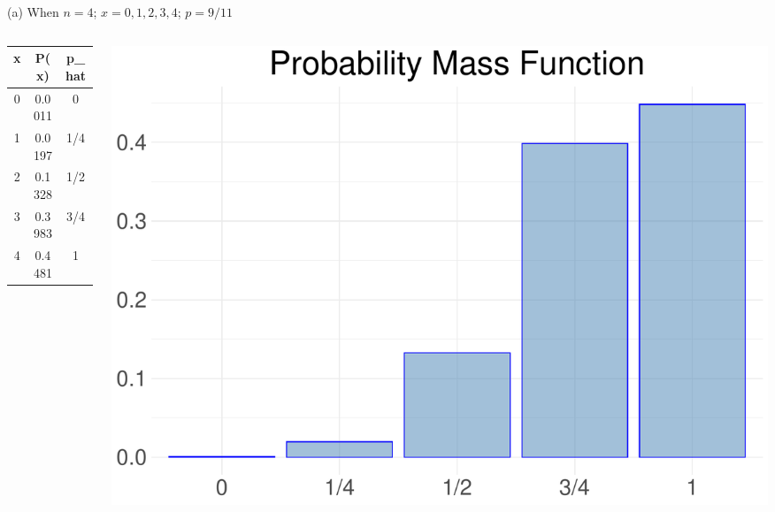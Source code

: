 \documentclass[
  11pt,
  ignorenonframetext,
]{beamer}
\begin{document}
\begin{frame}{(a) When \(n = 4\); \(x = 0,1,2,3,4\); \(p=9/11\)}
\protect\hypertarget{a-when-n-4-x-01234-p911}{}
\begin{columns}[T]
\begin{column}{0.48\textwidth}
\begin{table}
\centering
\begin{tabular}[t]{ccc}
\toprule
x & P(x) & p\_hat\\
\midrule
0 & 0.0011 & 0\\
1 & 0.0197 & 1/4\\
2 & 0.1328 & 1/2\\
3 & 0.3983 & 3/4\\
4 & 0.4481 & 1\\
\bottomrule
\end{tabular}
\end{table}
\end{column}

\begin{column}{0.48\textwidth}
\begin{center}\includegraphics[width=0.9\linewidth]{ECON1013_Tutorial2_files/figure-beamer/unnamed-chunk-13-1} \end{center}
\end{column}
\end{columns}
\end{frame}
\end{document}

